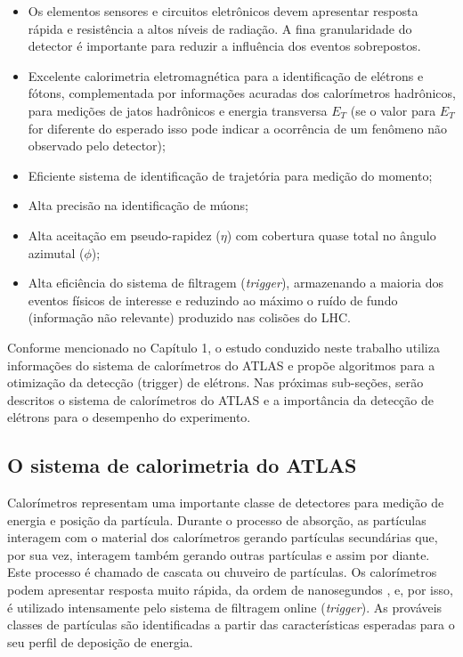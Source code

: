 \begin{itemize}
  \item Os elementos sensores e circuitos eletrônicos devem
  apresentar resposta rápida e resistência a altos níveis de
  radiação. A fina granularidade do detector é importante para
  reduzir a influência dos eventos sobrepostos.

  \item Excelente calorimetria eletromagnética para a identificação de
elétrons e fótons, complementada por informações acuradas dos
calorímetros hadrônicos, para medições de jatos hadrônicos e energia
transversa $E_T$ (se o valor para $E_T$ for diferente do esperado
isso pode indicar a ocorrência de um fenômeno não observado pelo
detector);

  \item Eficiente sistema de identificação de trajetória para medição do
momento;

  \item Alta precisão na identificação de múons;

  \item Alta aceitação em pseudo-rapidez ($\eta$) com cobertura quase total no
ângulo azimutal ($\phi$);

  \item Alta eficiência do sistema de filtragem (\textit{trigger}),
armazenando a maioria dos eventos físicos de interesse e reduzindo
ao máximo o ruído de fundo (informação não relevante) produzido nas
colisões do LHC.
\end{itemize}

Conforme mencionado no Capítulo 1, o estudo conduzido neste trabalho
utiliza informações do sistema de calorímetros do ATLAS e propõe
algoritmos para a otimização da detecção (trigger) de elétrons. Nas
próximas sub-seções, serão des\-cri\-tos o sistema de calorímetros do
ATLAS e a importância da detecção de elétrons para o desempenho do
experimento.

\subsection{O sistema de calorimetria do ATLAS}

Calorímetros \cite{book:wigmans:2000} representam uma importante classe de
detectores para medição de energia e posição da partícula. Durante o
processo de absorção, as partículas interagem com o material dos
calorímetros gerando partículas secundárias que, por sua vez,
interagem também gerando outras partículas e assim por diante. Este
processo é chamado de cascata ou chuveiro de partículas. Os
calorímetros podem apresentar resposta muito rápida, da ordem de nanosegundos 
\cite{book:wigmans:2000}, e, por isso, é utilizado intensamente pelo sistema
de filtragem online (\textit{trigger}). As prováveis classes de
partículas são identificadas a partir das características esperadas
para o seu perfil de deposição de energia.

